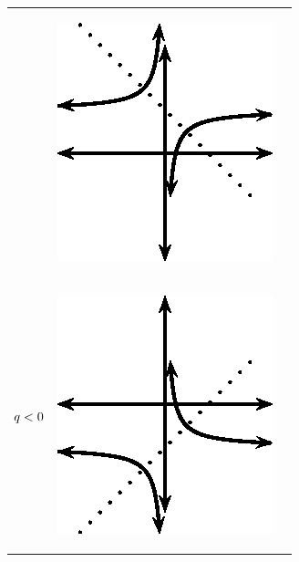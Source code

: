 \begin{center}
\begin{xtabular*}{\mytablewidth}[t]{|p{10\mystarwidth}|p{10\mystarwidth}|p{10\mystarwidth}|}
                 &
    \setcounter{subfigure}{0}
\label{m39341*id246943}
    \begin{center}
    \label{m39341*id246943!!!underscore!!!media}\label{m39341*id246943!!!underscore!!!printimage}\includegraphics[width=.3\columnwidth]{col11306.imgs/m39341_MG10C11_023.png} %
      \vspace{2pt}
    \vspace{.1in}
    \end{center}    
     \tabularnewline{}
                  $q<{}0$
                 &
    \setcounter{subfigure}{0}
\label{m39341*id246981}
    \begin{center}
    \label{m39341*id246981!!!underscore!!!media}\label{m39341*id246981!!!underscore!!!printimage}\includegraphics[width=.3\columnwidth]{col11306.imgs/m39341_MG10C11_024.png} %
      \vspace{2pt}
    \vspace{.1in}

\end{center}
\end{xtabular*}
\end{center}
